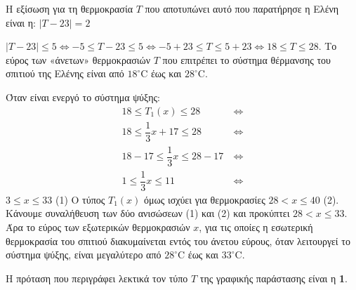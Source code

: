
\begin{alist}
\item Η εξίσωση για τη θερμοκρασία $T$ που αποτυπώνει αυτό που παρατήρησε η Ελένη είναι η:
$|T - 23| = 2$

\item $|T - 23| \le 5 \Leftrightarrow -5 \le T - 23 \le 5 \Leftrightarrow -5 + 23 \le T \le 5 + 23 \Leftrightarrow 18 \le T \le 28$.
Το εύρος των «άνετων» θερμοκρασιών $T$ που επιτρέπει το σύστημα θέρμανσης του σπιτιού της Ελένης είναι από $18^\circ\text{C}$ έως και $28^\circ\text{C}$.

\item Όταν είναι ενεργό το σύστημα ψύξης:
\begin{align*}
18 \le T_1(x) \le 28 \ &\Leftrightarrow \\
18 \le \dfrac{1}{3}x + 17 \le 28 \ &\Leftrightarrow \\
18 - 17 \le \dfrac{1}{3}x \le 28 - 17 \ &\Leftrightarrow \\
1 \le \dfrac{1}{3}x \le 11 \ &\Leftrightarrow
\end{align*}
$3 \le x \le 33$ (1)
Ο τύπος $T_1(x)$ όμως ισχύει για θερμοκρασίες $28 < x \le 40$ (2).
Κάνουμε συναλήθευση των δύο ανισώσεων (1) και (2) και προκύπτει $28 < x \le 33$. Άρα το εύρος των εξωτερικών θερμοκρασιών $x$, για τις οποίες η εσωτερική θερμοκρασία του σπιτιού διακυμαίνεται εντός του άνετου εύρους, όταν λειτουργεί το σύστημα ψύξης, είναι μεγαλύτερο από $28^\circ\text{C}$ έως και $33^\circ\text{C}$.

\item Η πρόταση που περιγράφει λεκτικά τον τύπο $T$ της γραφικής παράστασης είναι η \textbf{1}.
\end{alist}


